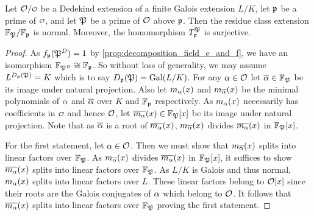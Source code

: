     \begin{proposition}\label{prop:T_map_is_surjective}
      Let \(\mc{O}/\smc{O}\) be a Dedekind extension of a finite Galois extension \(L/K\), let \(\mathfrak{p}\) be a prime of \(\smc{O}\), and let \(\mathfrak{P}\) be a prime of \(\mathcal{O}\) above \(\mathfrak{p}\). Then the residue class extension \(\mathbb{F}_{\mathfrak{P}}/\mathbb{F}_{\mathfrak{p}}\) is normal. Moreover, the homomorphism \(T_{\mathfrak{p}}^{\mathfrak{P}}\) is surjective.
    \end{proposition}
    \begin{proof}
      As \(f_{\mathfrak{p}}(\mathfrak{P}^{D}) = 1\) by \cref{prop:decomposition_field_e_and_f}, we have an isomorphism \(\mathbb{F}_{\mathfrak{P}^{D}} \cong \mathbb{F}_{\mathfrak{p}}\). So without loss of generality, we may assume \(L^{D_{\mathfrak{p}}(\mathfrak{P})} = K\) which is to say \(D_{\mathfrak{p}}(\mathfrak{P}) = \operatorname{\mathrm{Gal}}(L/K)\). For any \(\alpha \in \mathcal{O}\) let \(\overline{\alpha} \in \mathbb{F}_{\mathfrak{P}}\) be its image under natural projection. Also let \(m_{\alpha}(x)\) and \(m_{\overline{\alpha}}(x)\) be the minimal polynomials of \(\alpha\) and \(\overline{\alpha}\) over \(K\) and \(\mathbb{F}_{\mathfrak{p}}\) respectively. As \(m_{\alpha}(x)\) necessarily has coefficients in \(\smc{O}\) and hence \(\mathcal{O}\), let \(\overline{m_{\alpha}}(x) \in \mathbb{F}_{\mathfrak{P}}[x]\) be its image under natural projection. Note that as \(\overline{\alpha}\) is a root of \(\overline{m_{\alpha}}(x)\), \(m_{\overline{\alpha}}(x)\) divides \(\overline{m_{\alpha}}(x)\) in \(\mathbb{F}_{\mathfrak{P}}[x]\).

      For the first statement, let \(\alpha \in \mathcal{O}\). Then we must show that \(m_{\overline{\alpha}}(x)\) splits into linear factors over \(\mathbb{F}_{\mathfrak{P}}\). As \(m_{\overline{\alpha}}(x)\) divides \(\overline{m_{\alpha}}(x)\) in \(\mathbb{F}_{\mathfrak{P}}[x]\), it suffices to show \(\overline{m_{\alpha}}(x)\) splits into linear factors over \(\mathbb{F}_{\mathfrak{P}}\). As \(L/K\) is Galois and thus normal, \(m_{\alpha}(x)\) splits into linear factors over \(L\). These linear factors belong to \(\mathcal{O}[x]\) since their roots are the Galois conjugates of \(\alpha\) which belong to \(\mathcal{O}\). It follows that \(\overline{m_{\alpha}}(x)\) splits into linear factors over \(\mathbb{F}_{\mathfrak{P}}\) proving the first statement.
      

\end{proof}

